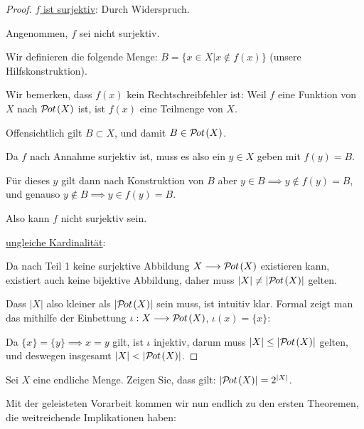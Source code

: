 \begin{proof}
    \underline{$f$ ist surjektiv}: Durch Widerspruch.


    Angenommen, $f$ sei nicht surjektiv.

    Wir definieren die folgende Menge: $B = \{x \in X | x \notin f(x)\}$ (unsere Hilfskonstruktion).
    
    Wir bemerken, dass $f(x)$ kein Rechtschreibfehler ist: Weil $f$ eine Funktion von $X$ nach $\mathcal{P}\hspace{-1pt}ot\hspace{1pt}(X)$ ist, ist $f(x)$ eine Teilmenge von $X$.

    Offensichtlich gilt $B \subset X$, und damit $B \in \mathcal{P}\hspace{-1pt}ot\hspace{1pt}(X)$.

    Da $f$ nach Annahme surjektiv ist, muss es also ein $y \in X$ geben mit $f(y) = B$.

    Für dieses $y$ gilt dann nach Konstruktion von $B$ aber $y \in B \implies y \notin f(y) = B$, und genauso $y \notin B \implies y \in f(y) = B$.\absurdum

    Also kann $f$ nicht surjektiv sein.

    \underline{ungleiche Kardinalität}:
    
    Da nach Teil 1 keine surjektive Abbildung $X \longrightarrow \mathcal{P}\hspace{-1pt}ot\hspace{1pt}(X)$ existieren kann, existiert auch keine bijektive Abbildung, daher muss $|X| \neq |\mathcal{P}\hspace{-1pt}ot\hspace{1pt}(X)|$ gelten.

    Dass $|X|$ also kleiner als $|\mathcal{P}\hspace{-1pt}ot\hspace{1pt}(X)|$ sein muss, ist intuitiv klar. Formal zeigt man das mithilfe der Einbettung $\iota: X \longrightarrow \mathcal{P}\hspace{-1pt}ot\hspace{1pt}(X)$, $\iota(x) = \{x\}$:
    
    Da $\{x\} = \{y\} \implies x = y$ gilt, ist $\iota$ injektiv, darum muss $|X| \leq |\mathcal{P}\hspace{-1pt}ot\hspace{1pt}(X)|$ gelten, und deswegen insgesamt $|X| < |\mathcal{P}\hspace{-1pt}ot\hspace{1pt}(X)|$.
\end{proof}

\begin{exercise}
    Sei $X$ eine endliche Menge. Zeigen Sie, dass gilt: $|\mathcal{P}\hspace{-1pt}ot\hspace{1pt}(X)| = 2^{|X|}$.
\end{exercise}

Mit der geleisteten Vorarbeit kommen wir nun endlich zu den ersten Theoremen, die weitreichende Implikationen haben:

